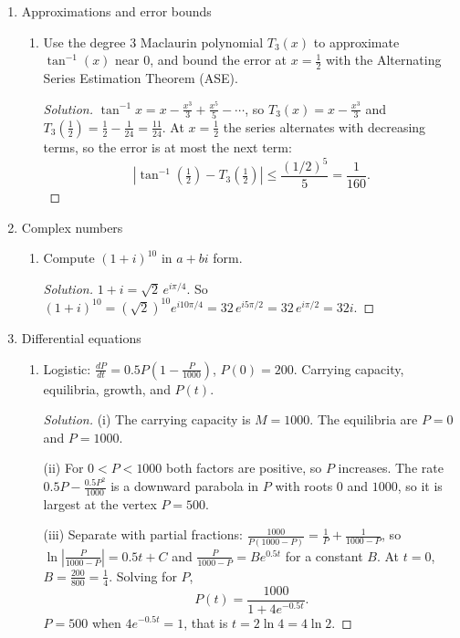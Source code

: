\documentclass[12pt]{article}
\newenvironment{solution}
  {\renewcommand\qedsymbol{$\blacksquare$}\begin{proof}[Solution]}
  {\end{proof}}
\begin{document}
\begin{enumerate}
\begin{enumerate}
\end{enumerate}

\setcounter{enumi}{28}
\item Approximations and error bounds
\begin{enumerate}

\item[(b)] Use the degree 3 Maclaurin polynomial $T_3(x)$ to approximate $\tan^{-1}(x)$ near $0$, and bound the error at $x=\frac12$ with the Alternating Series Estimation Theorem (ASE).
\begin{solution}
$\tan^{-1}x=x-\frac{x^3}{3}+\frac{x^5}{5}-\cdots$, so $T_3(x)=x-\frac{x^3}{3}$ and $T_3(\frac12)=\frac12-\frac1{24}=\frac{11}{24}$. At $x=\frac12$ the series alternates with decreasing terms, so the error is at most the next term:
\[ |\tan^{-1}(\tfrac12)-T_3(\tfrac12)|\le\frac{(1/2)^5}{5}=\frac{1}{160}. \]
\end{solution}






\end{enumerate}

\setcounter{enumi}{29}
\item Complex numbers
\begin{enumerate}
\item[(a)] Compute $(1+i)^{10}$ in $a+bi$ form.
\begin{solution}
$1+i=\sqrt2\,e^{i\pi/4}$. So $(1+i)^{10}=(\sqrt2)^{10}e^{i10\pi/4}=32\,e^{i5\pi/2}=32\,e^{i\pi/2}=32i$.
\end{solution}


\end{enumerate}

\setcounter{enumi}{30}
\item Differential equations
\begin{enumerate}









\item[(j)] Logistic: $\frac{dP}{dt}=0.5P\left(1-\frac{P}{1000}\right)$, $P(0)=200$. Carrying capacity, equilibria, growth, and $P(t)$.
\begin{solution}
(i) The carrying capacity is $M=1000$. The equilibria are $P=0$ and $P=1000$.

(ii) For $0<P<1000$ both factors are positive, so $P$ increases. The rate $0.5P-\frac{0.5P^2}{1000}$ is a downward parabola in $P$ with roots $0$ and $1000$, so it is largest at the vertex $P=500$.

(iii) Separate with partial fractions: $\frac{1000}{P(1000-P)}=\frac1P+\frac{1}{1000-P}$, so $\ln\left|\frac{P}{1000-P}\right|=0.5t+C$ and $\frac{P}{1000-P}=Be^{0.5t}$ for a constant $B$. At $t=0$, $B=\frac{200}{800}=\frac14$. Solving for $P$,
\[ P(t)=\frac{1000}{1+4e^{-0.5t}}. \]
$P=500$ when $4e^{-0.5t}=1$, that is $t=2\ln4=4\ln2$.
\end{solution}

\end{enumerate}

\end{enumerate}
\end{document}
